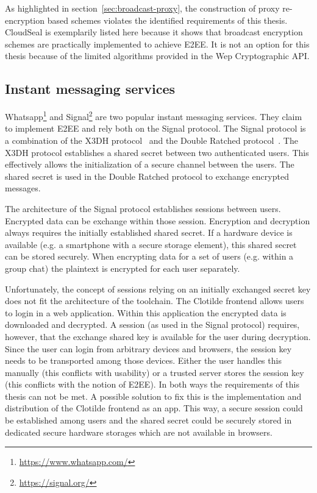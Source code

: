 \documentclass[../main.tex]{subfiles}
\begin{document}
As highlighted in section~\ref{sec:broadcast-proxy}, the construction of proxy re-encryption based schemes violates the identified requirements of this thesis.
CloudSeal is exemplarily listed here because it shows that broadcast encryption schemes are practically implemented to achieve E2EE.
It is not an option for this thesis because of the limited algorithms provided in the Wep Cryptographic API.

\subsection{Instant messaging services}
Whatsapp\footnote{\url{https://www.whatsapp.com/}} and Signal\footnote{\url{https://signal.org/}} are two popular instant messaging services.
They claim to implement E2EE and rely both on the Signal protocol.
The Signal protocol is a combination of the X3DH protocol~\cite{Marlinspike2016} and the Double Ratched protocol~\cite{Perrin2016}.
The X3DH protocol establishes a shared secret between two authenticated users.
This effectively allows the initialization of a secure channel between the users.
The shared secret is used in the Double Ratched protocol to exchange encrypted messages.~\cite{Marlinspike2016, Perrin2016}

The architecture of the Signal protocol establishes sessions between users.
Encrypted data can be exchange within those session.
Encryption and decryption always requires the initially established shared secret.
If a hardware device is available (e.g. a smartphone with a secure storage element), this shared secret can be stored securely. 
When encrypting data for a set of users (e.g. within a group chat) the plaintext is encrypted for each user separately.~\cite{Marlinspike2014}

Unfortunately, the concept of sessions relying on an initially exchanged secret key does not fit the architecture of the toolchain.
The Clotilde frontend allows users to login in a web application.
Within this application the encrypted data is downloaded and decrypted.
A session (as used in the Signal protocol) requires, however, that the exchange shared key is available for the user during decryption.
Since the user can login from arbitrary devices and browsers, the session key needs to be transported among those devices.
Either the user handles this manually (this conflicts with usability) or a trusted server stores the session key (this conflicts with the notion of E2EE).
In both ways the requirements of this thesis can not be met.
A possible solution to fix this is the implementation and distribution of the Clotilde frontend as an app.
This way, a secure session could be established among users and the shared secret could be securely stored in dedicated secure hardware storages which are not available in browsers.
\end{document}
